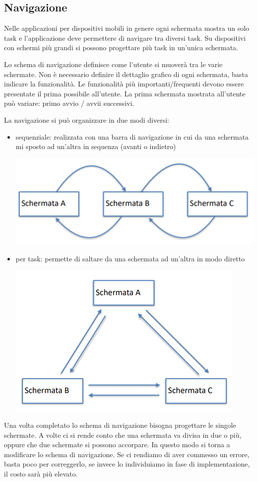 \subsection{Navigazione}
Nelle applicazioni per dispositivi mobili in genere ogni schermata 
mostra un solo task e l'applicazione deve permettere di navigare tra diversi task.
Su dispositivi con schermi più grandi si possono progettare più task in un’unica schermata.

Lo schema di navigazione definisce come l'utente si muoverà tra le varie schermate. 
Non è necessario definire il dettaglio grafico di ogni schermata, basta indicare la funzionalità.
Le funzionalità più importanti/frequenti devono essere presentate il prima possibile all'utente.
La prima schermata mostrata all'utente può variare: primo avvio /
avvii successivi.

La navigazione si può organizzare in due modi diversi:
\begin{itemize}
    \item sequenziale: realizzata con una barra di navigazione in cui da una schermata mi sposto ad un'altra in sequenza (avanti o indietro)
    \begin{center}
        \includegraphics[width=.5\textwidth]{images/Mobile computing/6. Progettazione/navigazione sequenziale.PNG}
    \end{center}
    \item per task: permette di saltare da una schermata ad un'altra in modo diretto
    \begin{center}
        \includegraphics[width=.5\textwidth]{images/Mobile computing/6. Progettazione/navigazione per task.PNG}
    \end{center}
\end{itemize}

Una volta completato lo schema di navigazione bisogna progettare le 
singole schermate. A volte ci si rende conto che una schermata va divisa in due o più, oppure che due schermate si possono accorpare. In questo modo si torna a modificare lo schema di navigazione. Se ci rendiamo di aver commesso un errore, basta poco per correggerlo, se invece lo individuiamo in fase di implementazione, il costo sarà più elevato. 

